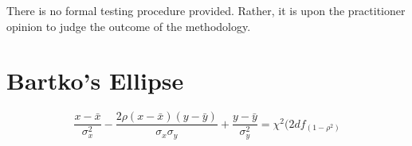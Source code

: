 \documentclass[MAIN.tex]{subfiles}
\begin{document}
	There is no formal testing procedure provided. Rather, it is upon
	the practitioner opinion to judge the outcome of the methodology.
	
	
	
	
	
	
	
	
	
	
	
	
	
	\section*{Bartko's Ellipse}
	
	\[ \frac{x - \bar{x}}{\sigma^2_x} - \frac{2\rho(x - \bar{x})(y - \bar{y})}{\sigma_x \sigma_y} + \frac{y - \bar{y}}{\sigma^2_y} = \chi^2(2df_(1-\rho^2) \]
	
	
\end{document}
